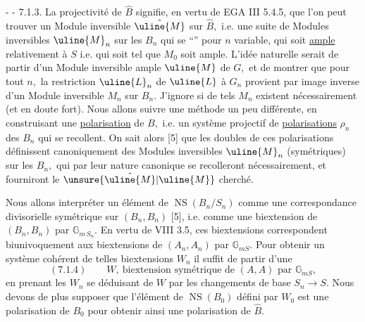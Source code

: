 -  -
7.1.3. La projectivité de \(\hat B\) signifie, en vertu de EGA III 5.4.5, que l'on peut trouver un Module inversible \(\hat{\uline{M}}\) sur \(\hat B,\) i.e. une suite de Modules inversibles \(\uline{M}_n\) sur les \(B_n\) qui se ``'' pour \(n\) variable, qui soit \uline{ample} relativement à \(S\) i.e. qui soit tel que \(M_0\) soit ample. L'idée naturelle serait de partir d'un Module inversible ample \(\uline{M}\) de \(G,\) et de montrer que pour tout \(n,\) la restriction \(\uline{L}_n\) de \(\uline{L}\) à \(G_n\) provient par image inverse d'un Module inversible \(M_n\) sur \(B_n.\) J'ignore si de tels \(M_n\) existent nécessairement (et en doute fort). Nous allons suivre une méthode un peu différente, en construisant une \uline{polarisation} de \(B,\) i.e. un système projectif de \uline{polarisations} \(\rho_n\) des \(B_n\) qui se recollent. On sait alors [5] que les doubles de ces polarisations définissent canoniquement des Modules inversibles \(\uline{M}_n\) (symétriques) sur les \(B_n,\) qui par leur nature canonique se recolleront nécessairement, et fourniront le \(\unsure{\hat{\uline{M}}|\uline{M}}\) cherché.

Nous allons interpréter un élément de \(\operatorname{NS}(B_n/S_n)\) comme une correspondance divisorielle symétrique sur \((B_n,B_n)\) [5], i.e. comme une biextension de \((B_n,B_n)\) par \(\mathbb G_{m\,S_n}.\) En vertu de VIII 3.5, ces biextensions correspondent biunivoquement aux biextensions de \((A_n,A_n)\) par \(\mathbb G_{mS}.\) Pour obtenir un système cohérent de telles biextensions \(W_n\) il suffit de partir d'une
\[
(7.1.4)\qquad W,\ \text{biextension symétrique de }(A,A)\text{ par }\mathbb G_{mS},
\]
en prenant les \(W_n\) se déduisant de \(W\) par les changements de base \(S_n\longrightarrow S.\) Nous devons de plus supposer que l'élément de \(\operatorname{NS}(B_0)\) défini par \(W_0\) est une polarisation de \(B_0\) pour obtenir ainsi une polarisation de \(\hat B.\)
